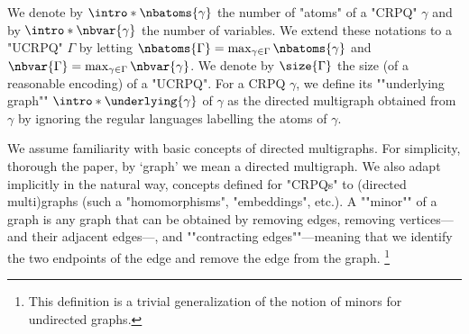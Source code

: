 \AP We denote by $\intro*\nbatoms{\gamma}$ the number of "atoms" of a "CRPQ" $\gamma$ and by $\intro*\nbvar{\gamma}$ the number of variables.
We extend these notations to a "UCRPQ" $\Gamma$ by letting
$\nbatoms{\Gamma} = \max_{\gamma \in \Gamma} \nbatoms{\gamma}$
and $\nbvar{\Gamma} = \max_{\gamma \in \Gamma} \nbvar{\gamma}$. 
We denote by $\size{\Gamma}$ the size (of a reasonable encoding) of a  "UCRPQ". 
For a CRPQ $\gamma$, we define its  \AP""underlying graph"" $\intro*\underlying{\gamma}$ of $\gamma$ as the directed multigraph obtained from $\gamma$ by ignoring the regular languages labelling the atoms of $\gamma$. 

We assume familiarity with basic concepts of directed multigraphs.
For simplicity, thorough the paper, by `graph' we mean a directed multigraph. We also adapt implicitly in the natural way, concepts defined for "CRPQs" to (directed multi)graphs (such a "homomorphisms", "embeddings", etc.).
A \AP""minor"" of a graph is any graph that can be obtained by removing
edges, removing vertices---and their adjacent edges---, and \AP""contracting edges""---meaning that we identify the two endpoints of the edge and remove the edge from the graph.%
\footnote{This definition is a trivial generalization of the notion of minors for undirected graphs.}
